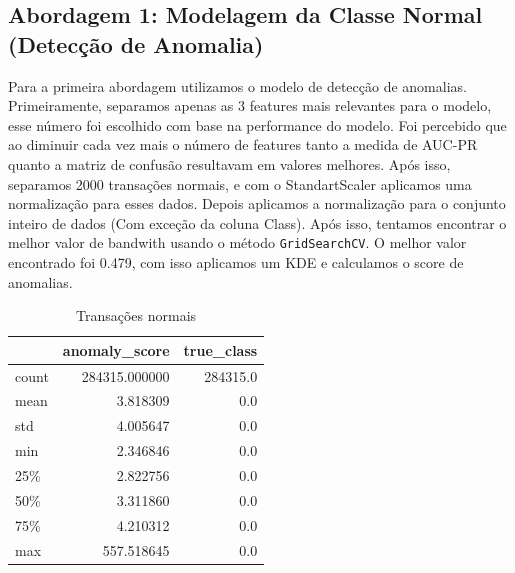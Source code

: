 \documentclass[conference]{IEEEtran}
\begin{document}
\subsection{Abordagem 1: Modelagem da Classe Normal (Detecção de Anomalia)}
\label{subsec:abordagem1}
  Para a primeira abordagem utilizamos o modelo de detecção de anomalias. Primeiramente, separamos apenas as 3 features mais relevantes para o modelo, esse número foi escolhido com base na performance do modelo. Foi percebido que ao diminuir cada vez mais o número de features tanto a medida de AUC-PR quanto a matriz de confusão resultavam em valores melhores. Após isso, separamos 2000 transações normais, e com o StandartScaler aplicamos uma normalização para esses dados. Depois aplicamos a normalização para o conjunto inteiro de dados (Com exceção da coluna Class). Após isso, tentamos encontrar o melhor valor de bandwith usando o método \texttt{GridSearchCV}. O melhor valor encontrado foi 0.479, com isso aplicamos um KDE e calculamos o score de anomalias.
\begin{table}[H]
    \caption{Transações normais}
    \label{tab:score_anomalia_normal}
    \centering
    \begin{tabular}{lrr}
        \toprule
        & \textbf{anomaly\_score} & \textbf{true\_class} \\
        \midrule
        count & 284315.000000 & 284315.0 \\
        mean & 3.818309 & 0.0 \\
        std & 4.005647 & 0.0 \\
        min & 2.346846 & 0.0 \\
        25\% & 2.822756 & 0.0 \\
        50\% & 3.311860 & 0.0 \\
        75\% & 4.210312 & 0.0 \\
        max & 557.518645 & 0.0 \\
        \bottomrule
    \end{tabular}
\end{table}
\end{document}
